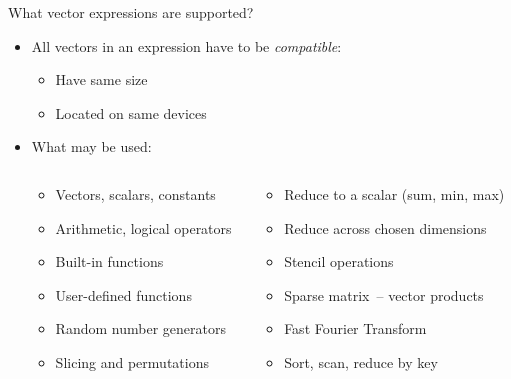 \documentclass[@BEAMER_OPTIONS@]{beamer}
\begin{document}
\note{ }

\begin{frame}[fragile]{What vector expressions are supported?}
    \begin{itemize}
        \item All vectors in an expression have to be \emph{compatible}:
            \begin{itemize}
                \item Have same size
                \item Located on same devices
            \end{itemize}
            \vspace{\baselineskip}
        \item What may be used:
            \begin{columns}
                \begin{column}{0.4\textwidth}
                    \begin{itemize}
                        \item Vectors, scalars, constants
                        \item Arithmetic, logical operators
                        \item Built-in functions
                        \item User-defined functions
                        \item Random number generators
                        \item Slicing and permutations
                    \end{itemize}
                \end{column}
                \begin{column}{0.42\textwidth}
                    \begin{itemize}
                        \item Reduce to a scalar (sum, min, max)
                        \item Reduce across chosen dimensions
                        \item Stencil operations
                        \item Sparse matrix~-- vector products
                        \item Fast Fourier Transform
                        \item Sort, scan, reduce by key
                    \end{itemize}
                \end{column}
            \end{columns}
    \end{itemize}
\end{frame}
\end{document}
